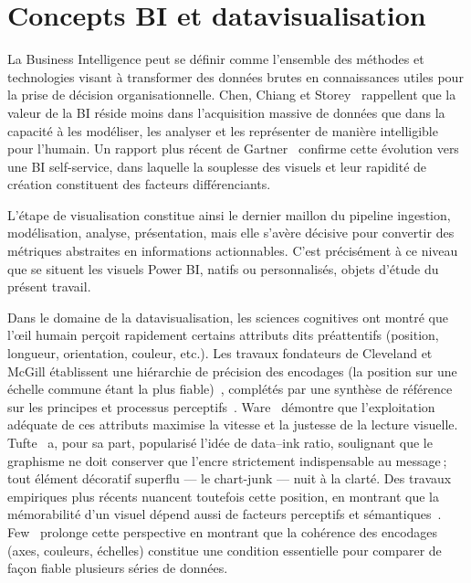 \section{Concepts BI et datavisualisation}
\label{sec:concepts-bi-dataviz}

La Business Intelligence peut se définir comme l’ensemble des méthodes et technologies visant à transformer des données brutes en connaissances utiles pour la prise de décision organisationnelle. Chen, Chiang et Storey~\parencite{Chen2012} rappellent que la valeur de la BI réside moins dans l’acquisition massive de données que dans la capacité à les modéliser, les analyser et les représenter de manière intelligible pour l’humain. Un rapport plus récent de Gartner~\parencite{Gartner2024} confirme cette évolution vers une BI self-service, dans laquelle la souplesse des visuels et leur rapidité de création constituent des facteurs différenciants.

L’étape de visualisation constitue ainsi le dernier maillon du pipeline \og ingestion, modélisation, analyse, présentation\fg{}, mais elle s’avère décisive pour convertir des métriques abstraites en informations actionnables. C’est précisément à ce niveau que se situent les visuels Power BI, natifs ou personnalisés, objets d’étude du présent travail.

Dans le domaine de la datavisualisation, les sciences cognitives ont montré que l’œil humain perçoit rapidement certains attributs dits préattentifs (position, longueur, orientation, couleur, etc.). Les travaux fondateurs de Cleveland et McGill établissent une hiérarchie de précision des encodages (la position sur une échelle commune étant la plus fiable)~\parencite{ClevelandMcGill1984}, complétés par une synthèse de référence sur les principes et processus perceptifs~\parencite{Munzner2014}. Ware~\parencite{Ware2019} démontre que l’exploitation adéquate de ces attributs maximise la vitesse et la justesse de la lecture visuelle. Tufte~\parencite{Tufte1983} a, pour sa part, popularisé l’idée de data–ink ratio, soulignant que le graphisme ne doit conserver que l’encre strictement indispensable au message ; tout élément décoratif superflu — le chart-junk — nuit à la clarté. Des travaux empiriques plus récents nuancent toutefois cette position, en montrant que la mémorabilité d’un visuel dépend aussi de facteurs perceptifs et sémantiques~\parencite{BorkinEtAl2013}. Few~\parencite{Few2009} prolonge cette perspective en montrant que la cohérence des encodages (axes, couleurs, échelles) constitue une condition essentielle pour comparer de façon fiable plusieurs séries de données.

